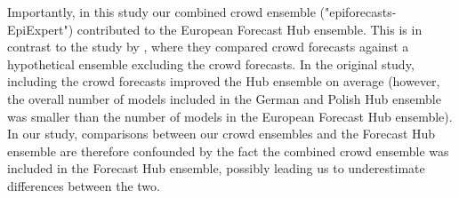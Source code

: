 \documentclass[10pt,a4paper,twocolumn]{article}
\begin{document}
Importantly, in this study our combined crowd ensemble ("epiforecasts-EpiExpert") contributed to the European Forecast Hub ensemble. This is in contrast to the study by \citet{bosseComparingHumanModelbased2022}, where they compared crowd forecasts against a hypothetical ensemble excluding the crowd forecasts. In the original study, including the crowd forecasts improved the Hub ensemble on average (however, the overall number of models included in the German and Polish Hub ensemble was smaller than the number of models in the European Forecast Hub ensemble). In our study, comparisons between our crowd ensembles and the Forecast Hub ensemble are therefore confounded by the fact the combined crowd ensemble was included in the Forecast Hub ensemble, possibly leading us to underestimate differences between the two. 

\end{document}
